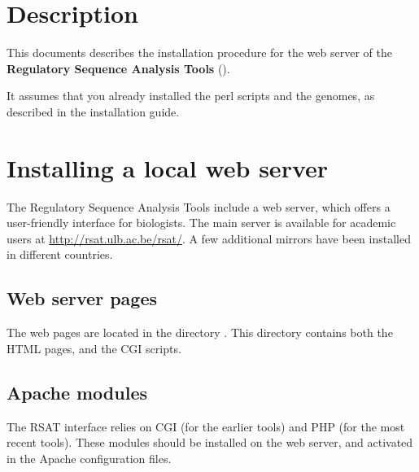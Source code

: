 \documentclass[12pt,a4paper, twoside]{scrreprt} %
\begin{document}


\newpage
\tableofcontents
\newpage

\section{Description}

This documents describes the installation procedure for the web server
of the \textbf{Regulatory Sequence Analysis Tools} (\RSAT).

It assumes that you already installed the perl scripts and the
genomes, as described in the \RSAT installation guide.


\section{Installing a local web server}

The Regulatory Sequence Analysis Tools include a web server, which
offers a user-friendly interface for biologists. The main server is
available for academic users at \url{http://rsat.ulb.ac.be/rsat/}. A
few additional mirrors have been installed in different countries.

\subsection{Web server pages}

The web pages are located in the directory
. This directory contains both the HTML
pages, and the CGI scripts.

\subsection{Apache modules}

The RSAT interface relies on CGI (for the earlier tools) and PHP (for
the most recent tools). These modules should be installed on the web
server, and activated in the Apache configuration files. 
\end{document}
